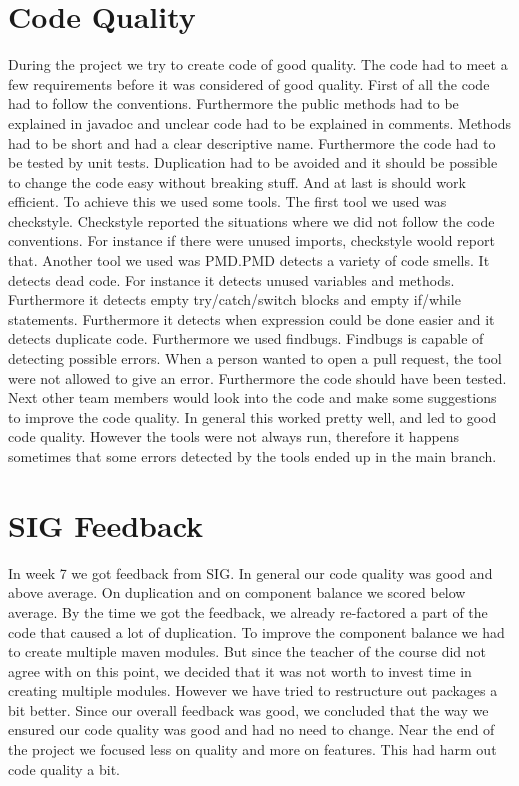\section{Code Quality}
During the project we try to create code of good quality. The code had to meet a few requirements before it was considered of good quality. First of all the code had to follow the conventions. Furthermore the public methods had to be explained in javadoc and unclear code had to be explained in comments. Methods had to be short and had a clear descriptive name. Furthermore the code had to be tested by unit tests. Duplication had to be avoided and it should be possible to change the code easy without breaking stuff. And at last is should work efficient. 
To achieve this we used some tools. The first tool we used was checkstyle. Checkstyle reported the situations where we did not follow the code conventions. For instance if there were unused imports, checkstyle woold report that. 
Another tool we used was PMD.PMD detects a variety of code smells. It detects dead code. For instance it detects unused variables and methods. Furthermore it detects empty try/catch/switch blocks and empty if/while statements. Furthermore it detects when expression could be done easier and it detects duplicate code. 
Furthermore we used findbugs. Findbugs is capable of detecting possible errors.
When a person wanted to open a pull request, the tool were not allowed to give an error. Furthermore the code should have been tested. Next other team members would look into the code and make some suggestions to improve the code quality.
In general this worked pretty well, and led to good code quality. However the tools were not always run, therefore it happens sometimes that some errors detected by the tools ended up in the main branch. 
\section{SIG Feedback}
In week 7 we got feedback from SIG. In general our code quality was good and above average. On duplication and on component balance we scored below average. By the time we got the feedback, we already re-factored a part of the code that caused a lot of duplication. To improve the component balance we had to create multiple maven modules. But since the teacher of the course did not agree with on this point, we decided that it was not worth to invest time in creating multiple modules. However we have tried to restructure out packages a bit better. Since our overall feedback was good, we concluded that the way we ensured our code quality was good and had no need to change.
Near the end of the project we focused less on quality and more on features. This had harm out code quality a bit. 
